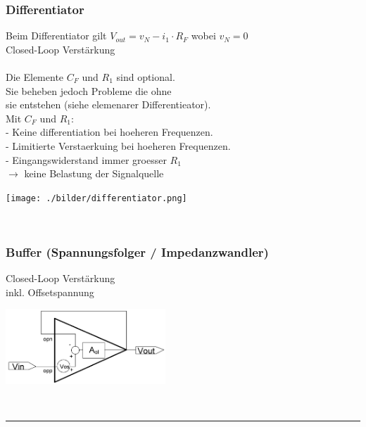 		\subsubsection{Differentiator}
        \begin{minipage}[T]{13cm}
            Beim Differentiator gilt $V_{out}=v_N-i_1 \cdot R_F$ wobei $v_N=0$\\
            Closed-Loop Verst\"arkung
            \hspace{3mm}\\
            \hspace*{43.2mm}\\
            Die Elemente $C_F$ und $R_1$ sind optional. \\
            Sie beheben jedoch Probleme die ohne \\
            sie entstehen (siehe elemenarer Differentieator). \\
            Mit $C_F$ und $R_1$: \\
            - Keine differentiation bei hoeheren Frequenzen. \\
            - Limitierte Verstaerkuing bei hoeheren Frequenzen. \\
            - Eingangswiderstand immer groesser $R_1$ \\ 
            $\rightarrow$ keine Belastung der Signalquelle\\            
        \end{minipage}
        \begin{minipage}{6cm}
            \texttt{[image: ./bilder/differentiator.png]}
        \end{minipage}\\
\newpage

        \subsubsection{Buffer (Spannungsfolger / Impedanzwandler)}
            \begin{minipage}[T]{13cm}
                Closed-Loop Verst\"arkung
                \hspace{3mm}\\
                inkl. Offsetspannung
                \hspace{10.2mm}
            \end{minipage} 
            \begin{minipage}{6cm}
                \includegraphics[width=6cm]{./bilder/buffer.png} 
            \end{minipage}\\		
\hrule

